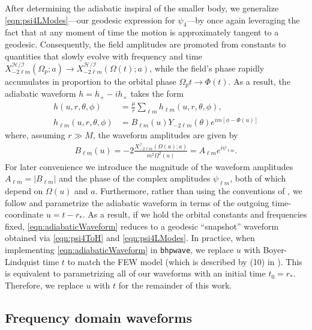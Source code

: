 \documentclass[%
 reprint,
 nofootinbib,
 amsmath,amssymb,
 aps,
 prd,
]{revtex4-2}
\begin{document}
After determining the adiabatic inspiral of the smaller body, we generalize \eqref{eqn:psi4LModes}---our geodesic expression for $\psi_4$---by once again leveraging the fact that at any moment of time the motion is approximately tangent to a geodesic. Consequently, the field amplitudes are promoted from constants to quantities that slowly evolve with frequency and time $X^\mathcal{H/I}_{-2\ell m}(\Omega_p; a) \rightarrow X^\mathcal{H/I}_{-2\ell m}(\Omega(t); a)$, while the field's phase rapidly accumulates in proportion to the orbital phase $\Omega_p t \rightarrow \Phi(t)$. As a result, the adiabatic waveform $h = h_+ - i h_\times$ takes the form
\begin{subequations} \label{eqn:adiabaticWaveform}
\begin{align} 
    h(u,r,\theta,\phi) &= \frac{\mu}{r}\sum_{\ell m} h_{\ell m}(u,r,\theta,\phi),
    \\
    h_{\ell m}(u,r,\theta,\phi) & = B_{\ell m}(u) Y_{-2\ell m}(\theta) e^{im[\phi - \Phi(u)]}  
\end{align}
\end{subequations}
where, assuming $r \gg M$, the waveform amplitudes are given by
\begin{align} \label{eqn:amplitude}
    B_{\ell m}(u) = -2\frac{X_{-2\ell m}^\mathcal{I}( \Omega(u);a)}{m^2\Omega^2(u)} = A_{\ell m} e^{i \psi_{\ell m}}.
\end{align}
For later convenience we introduce the magnitude of the waveform amplitudes $A_{\ell m} = |B_{\ell m}|$ and the phase of the complex amplitudes $\psi_{\ell m}$, both of which depend on $\Omega(u)$ and $a$. Furthermore, rather than using the conventions of \cite{KatzETC21,HughETC21}, we follow \cite{PounWard20} and parametrize the adiabatic waveform in terms of the outgoing time-coordinate $u=t-r_*$. As a result, if we hold the orbital constants and frequencies fixed, \eqref{eqn:adiabaticWaveform} reduces to a geodesic ``snapshot'' waveform obtained via \eqref{eqn:psi4ToH} and \eqref{eqn:psi4LModes}. In practice, when implementing \eqref{eqn:adiabaticWaveform} in \texttt{bhpwave}, we replace $u$ with Boyer-Lindquist time $t$ to match the FEW model (which is described by (10) in \cite{KatzETC21}). This is equivalent to parametrizing all of our waveforms with an initial time $t_0 = r_*$. Therefore, we replace $u$ with $t$ for the remainder of this work.

\subsection{Frequency domain waveforms}
\end{document}

